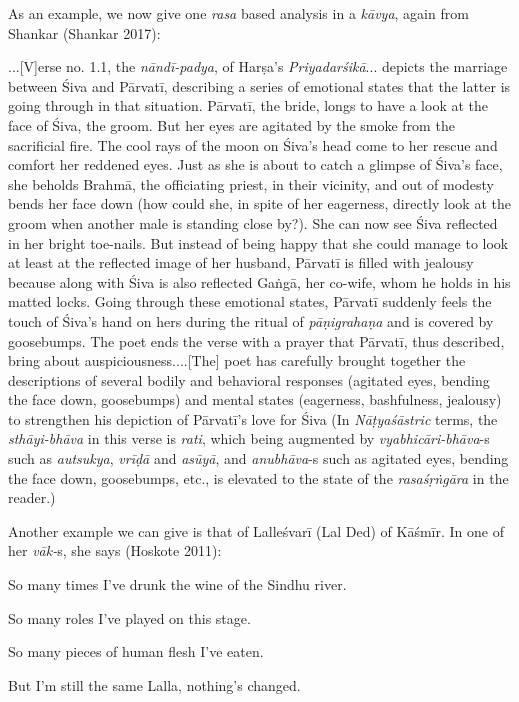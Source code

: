 As an example, we now give one \textsl{rasa} based analysis in a \textsl{kāvya}, again from Shankar (Shankar 2017):

\begin{myquote}
...[V]erse no. 1.1, the \textsl{nāndī-padya}, of Harṣa’s \textsl{Priyadarśikā}... depicts the marriage between Śiva and Pārvatī, describing a series of emotional states that the latter is going through in that situation. Pārvatī, the bride, longs to have a look at the face of Śiva, the groom. But her eyes are agitated by the smoke from the sacrificial fire. The cool rays of the moon on Śiva’s head come to her rescue and comfort her reddened eyes. Just as she is about to catch a glimpse of Śiva’s face, she beholds Brahmā, the officiating priest, in their vicinity, and out of modesty bends her face down (how could she, in spite of her eagerness, directly look at the groom when another male is standing close by?). She can now see Śiva reflected in her bright toe-nails. But instead of being happy that she could manage to look at least at the reflected image of her husband, Pārvatī is filled with jealousy because along with Śiva is also reflected Gaṅgā, her co-wife, whom he holds in his matted locks. Going through these emotional states, Pārvatī suddenly feels the touch of Śiva’s hand on hers during the ritual of \textsl{pāṇigrahaṇa} and is covered by goosebumps. The poet ends the verse with a prayer that Pārvatī, thus described, bring about auspiciousness....[The] poet has carefully brought together the descriptions of several bodily and behavioral responses (agitated eyes, bending the face down, goosebumps) and mental states (eagerness, bashfulness, jealousy) to strengthen his depiction of Pārvatī’s love for Śiva (In \textsl{Nāṭyaśāstric} terms, the \textsl{sthāyi-bhāva} in this verse is \textsl{rati}, which being augmented by \textsl{vyabhicāri-bhāva}-s such as \textsl{autsukya}, \textsl{vrīḍā} and \textsl{asūyā}, and \textsl{anubhāva}-s such as agitated eyes, bending the face down, goosebumps, etc., is elevated to the state of the \textsl{rasaśṛṅgāra} in the reader.)
\end{myquote}

Another example we can give is that of Lalleśvarī (Lal Ded) of Kāśmīr. In one of her \textsl{vāk-}s, she says (Hoskote 2011):

\begin{myquote}
So many times I’ve drunk the wine of the Sindhu river.

So many roles I’ve played on this stage.

So many pieces of human flesh I’ve eaten.

But I’m still the same Lalla, nothing’s changed.
\end{myquote}

